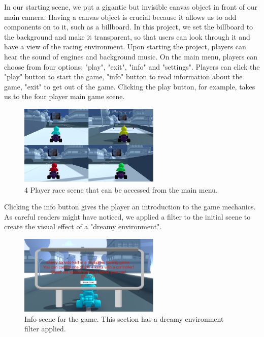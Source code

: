 \documentclass[a4paper,10pt]{article}
\begin{document}
In our starting scene, we put a gigantic but invisible canvas object in front of our main camera. Having a canvas object is crucial because it allows us to add components on to it, such as a billboard. In this project, we set the billboard to the background and make it transparent, so that users can look through it and have a view of the racing environment. Upon starting the project, players can hear the sound of engines and background music. On the main menu, players can choose from four options: "play", "exit", "info" and "settings".  Players can click the "play" button to start the game, "info" button to read information about the game, "exit" to get out of the game. Clicking the play button, for example, takes us to the four player main game scene.

 \begin{figure}[H]
  \centering
      \includegraphics[width=0.6\textwidth]{Assets/MainGame.png}
  \caption{4 Player race scene that can be accessed from the main menu.}
\end{figure}

Clicking the info button gives the player an introduction to the game mechanics. As careful readers might have noticed, we applied a filter to the initial scene to create the visual effect of a "dreamy environment".

 \begin{figure}[H]
  \centering
      \includegraphics[width=0.6\textwidth]{Assets/Info.png}
  \caption{Info scene for the game. This section has a dreamy environment filter applied.}
\end{figure}
\end{document}
